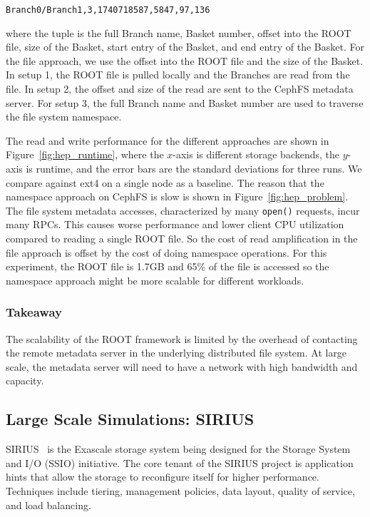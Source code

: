 \texttt{Branch0/Branch1,3,1740718587,5847,97,136}

where the tuple is the full Branch name, Basket number, offset into the ROOT
file, size of the Basket, start entry of the Basket, and end entry of the
Basket.  For the file approach, we use the offset into the ROOT file and the
size of the Basket.  In setup 1, the ROOT file is pulled locally and the
Branches are read from the file. In setup 2, the offset and size of the read
are sent to the CephFS metadata server.  For setup 3, the full Branch name and
Basket number are used to traverse the file system namespace.


The read and write performance for the different approaches are shown in
Figure~\ref{fig:hep_runtime}, where the \(x\)-axis is different storage
backends, the \(y\)-axis is runtime, and the error bars are the standard
deviations for three runs. We compare against ext4 on a single node as a
baseline. The reason that the namespace approach on CephFS is slow is shown in
Figure~\ref{fig:hep_problem}. The file system metadata accesses, characterized
by many \texttt{open()} requests, incur many RPCs. This causes worse
performance and lower client CPU utilization compared to reading a single ROOT
file.  So the cost of read amplification in the file approach is offset by the
cost of doing namespace operations. For this experiment, the ROOT file is 1.7GB
and 65\% of the file is accessed so the namespace approach might be more
scalable for different workloads.

\subsubsection*{Takeaway} The scalability of the ROOT framework is limited by the
overhead of contacting the remote metadata server in the underlying distributed
file system. At large scale, the metadata server will need to have a network
with high bandwidth and capacity.

\subsection{Large Scale Simulations: SIRIUS}

SIRIUS~\cite{klasky:journal16-sirius} is the Exascale storage system being
designed for the Storage System and I/O (SSIO) initiative. The core tenant of
the SIRIUS project is application hints that allow the storage to reconfigure
itself for higher performance. Techniques include tiering, management policies,
data layout, quality of service, and load balancing. 

